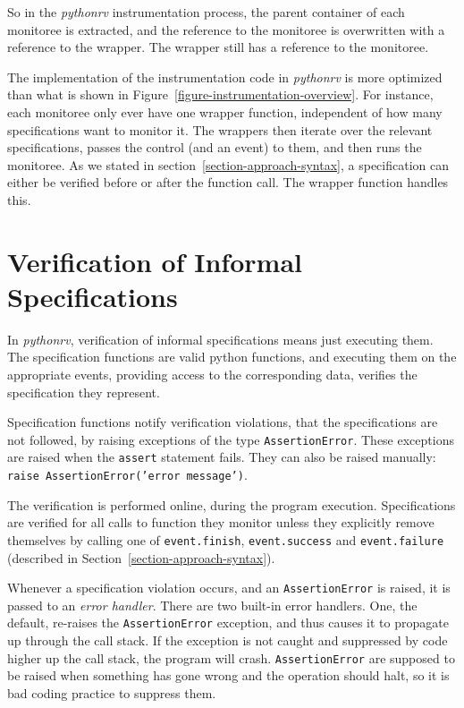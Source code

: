 
So in the \textit{pythonrv} instrumentation process, the parent container of
each monitoree is extracted, and the reference to the monitoree is overwritten
with a reference to the wrapper. The wrapper still has a reference to the
monitoree.

The implementation of the instrumentation code in \textit{pythonrv} is more
optimized than what is shown in Figure~\ref{figure-instrumentation-overview}.
For instance, each monitoree only ever have one wrapper function, independent
of how many specifications want to monitor it. The wrappers then iterate over
the relevant specifications, passes the control (and an event) to them, and
then runs the monitoree. As we stated in section~\ref{section-approach-syntax},
a specification can either be verified before or after the function call. The
wrapper function handles this.



\section{Verification of Informal Specifications}
\label{section-approach-verification}

In \textit{pythonrv}, verification of informal specifications means just
executing them. The specification functions are valid python functions, and
executing them on the appropriate events, providing access to the corresponding
data, verifies the specification they represent.

Specification functions notify verification violations, that the specifications
are not followed, by raising exceptions of the type \texttt{AssertionError}.
These exceptions are raised when the \texttt{assert} statement fails. They can
also be raised manually: \texttt{raise AssertionError('error message')}.

The verification is performed online, during the program execution.
Specifications are verified for all calls to function they monitor unless they
explicitly remove themselves by calling one of \texttt{event.finish},
\texttt{event.success} and \texttt{event.failure} (described in
Section~\ref{section-approach-syntax}).

Whenever a specification violation occurs, and an \texttt{AssertionError} is
raised, it is passed to an \textit{error handler}. There are two built-in error
handlers. One, the default, re-raises the \texttt{AssertionError} exception,
and thus causes it to propagate up through the call stack. If the exception
is not caught and suppressed by code higher up the call stack, the program will
crash. \texttt{AssertionError} are supposed to be raised when something has
gone wrong and the operation should halt, so it is bad coding practice to
suppress them.

